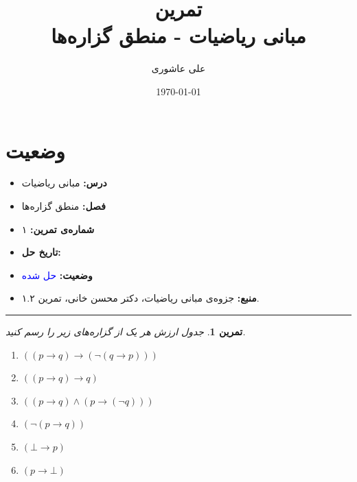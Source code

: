 \documentclass[a4paper,12pt]{article}
\title{%
	\Huge \textbf{تمرین} \\[0.3cm]
	\Large مبانی ریاضیات - منطق گزاره‌ها
}
\author{علی عاشوری}
\date{\today}
\theoremstyle{exercise}
\newtheorem{exercise}{تمرین}
\begin{document}
	
	\maketitle
	
	\section*{وضعیت}
	\begin{itemize}
		\item \textbf{درس:} مبانی ریاضیات
		\item \textbf{فصل:} منطق گزاره‌ها
		\item \textbf{شماره‌ی تمرین:} ۱
		\item \textbf{تاریخ حل:} 
		\item \textbf{وضعیت:} \textcolor{blue}{حل شده}
		\item \textbf{منبع:} جزوه‌ی مبانی ریاضیات، دکتر محسن خانی، تمرین ۱.۲.
	\end{itemize}
	\rule{\textwidth}{0.4pt}
	
	\begin{exercise}
		جدول ارزش هر یک از گزاره‌های زیر را رسم کنید.
		\begin{enumerate}
			\item $((p \rightarrow q) \rightarrow (\neg(q \rightarrow p)))$
			\item $((p \rightarrow q) \rightarrow q)$
			\item $((p \rightarrow q) \wedge (p \rightarrow (\neg q)))$
			\item $(\neg (p \rightarrow q))$
			\item $(\bot \rightarrow p)$
			\item $(p \rightarrow \bot)$
		\end{enumerate}
	\end{exercise}
	
\end{document}

